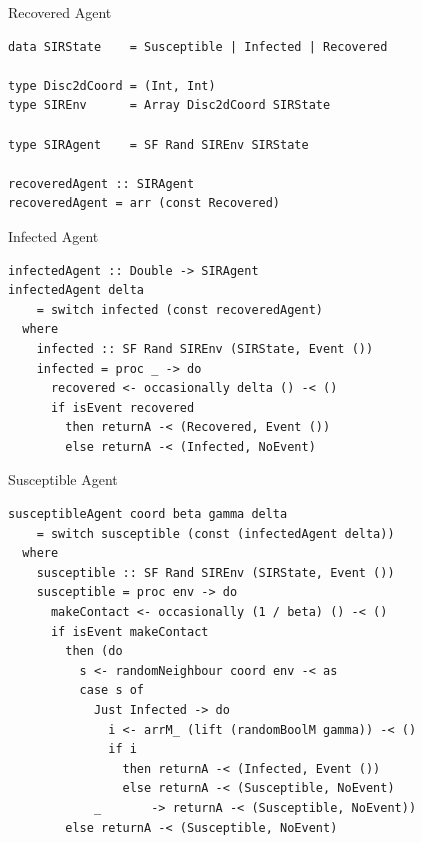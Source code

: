 \documentclass{beamer} %
\begin{document}
\begin{frame}[fragile]{Recovered Agent}
\begin{block}{}
\begin{verbatim}
data SIRState    = Susceptible | Infected | Recovered

type Disc2dCoord = (Int, Int)
type SIREnv      = Array Disc2dCoord SIRState

type SIRAgent    = SF Rand SIREnv SIRState

recoveredAgent :: SIRAgent
recoveredAgent = arr (const Recovered) 
\end{verbatim}
\end{block}
\end{frame}

\begin{frame}[fragile]{Infected Agent}
\begin{block}{}
\begin{verbatim}
infectedAgent :: Double -> SIRAgent
infectedAgent delta
    = switch infected (const recoveredAgent)
  where
    infected :: SF Rand SIREnv (SIRState, Event ())
    infected = proc _ -> do
      recovered <- occasionally delta () -< ()
      if isEvent recovered
        then returnA -< (Recovered, Event ())
        else returnA -< (Infected, NoEvent)
\end{verbatim}
\end{block}
\end{frame}

\begin{frame}[fragile]{Susceptible Agent}
\begin{block}{}
\begin{verbatim}
susceptibleAgent coord beta gamma delta 
    = switch susceptible (const (infectedAgent delta))
  where
    susceptible :: SF Rand SIREnv (SIRState, Event ())
    susceptible = proc env -> do
      makeContact <- occasionally (1 / beta) () -< ()
      if isEvent makeContact
        then (do
          s <- randomNeighbour coord env -< as
          case s of
            Just Infected -> do
              i <- arrM_ (lift (randomBoolM gamma)) -< ()
              if i
                then returnA -< (Infected, Event ())
                else returnA -< (Susceptible, NoEvent)
            _       -> returnA -< (Susceptible, NoEvent))
        else returnA -< (Susceptible, NoEvent)
\end{verbatim}
\end{block}
\end{frame}
\end{document}
